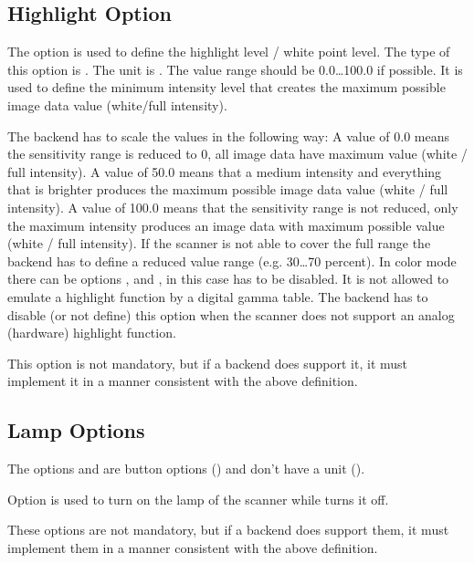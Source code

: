 \documentclass[11pt,DVIps]{report}
\begin{document}
\begin{changebar}
\subsection{Highlight Option}
The option  is used to define the highlight level / white point level.
The type of this option is .
The unit is . The value range
should be 0.0\ldots100.0 if possible.
It is used to define the minimum intensity level that creates the maximum possible
image data value (white/full intensity). 

The backend has to scale the values in the following way:
A value of 0.0 means the sensitivity range is reduced to 0, all image
data have maximum value (white / full intensity).
A value of 50.0 means that a medium intensity and everything that is brighter
produces the maximum possible image data value (white / full intensity).
A value of 100.0 means that the sensitivity range is not reduced, only the
maximum intensity produces an image data with maximum possible value (white / full intensity).
If  the scanner is not able to cover the full range the backend has to define a reduced
value range (e.g. 30\ldots70 percent).
In color mode there can be options , 
and , in this case  has to be disabled.
It is not allowed to emulate a highlight function by
a digital gamma table. The backend has to disable (or not
define) this option when the scanner does not support an
analog (hardware) highlight function.

This option is not mandatory, but if a backend does support it, it
must implement it in a manner consistent with the above definition.
\end{changebar}


\begin{changebar}
\subsection{Lamp Options}

The options  and  are button options
() and don't have a unit ().

Option  is used to turn on the lamp of the scanner while
 turns it off.

These options are not mandatory, but if a backend does support them, it
must implement them in a manner consistent with the above definition.
\end{changebar}
\end{document}
